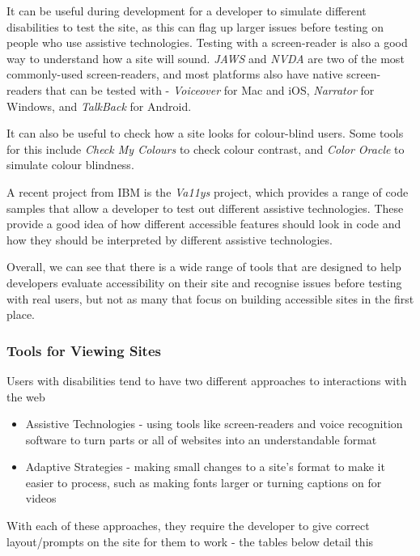 \documentclass[ %
                    author={Aleena Baig},
                supervisor={Dr Simon Lock},
                    degree={BSc},
                     title={On Making Web Accessible Graphs},
                  subtitle={},
                      year={2019} ]{dissertation}
\begin{document}
It can be useful during development for a developer to simulate different disabilities to test the site, as this can flag up larger issues before testing on people who use assistive technologies. Testing with a screen-reader is also a good way to understand how a site will sound. \textit{JAWS} and \textit{NVDA} are two of the most commonly-used screen-readers, and most platforms also have native screen-readers that can be tested with - \textit{Voiceover} for Mac and iOS, \textit{Narrator} for Windows, and \textit{TalkBack} for Android.

It can also be useful to check how a site looks for colour-blind users. Some tools for this include \textit{Check My Colours} to check colour contrast, and \textit{Color Oracle} to simulate colour blindness.

A recent project from IBM is the \textit{Va11ys} project, which provides a range of code samples that allow a developer to test out different assistive technologies. These provide a good idea of how different accessible features should look in code and how they should be interpreted by different assistive technologies.

Overall, we can see that there is a wide range of tools that are designed to help developers evaluate accessibility on their site and recognise issues before testing with real users, but not as many that focus on building accessible sites in the first place.


\subsubsection{Tools for Viewing Sites}

Users with disabilities tend to have two different approaches to interactions with the web

\begin{itemize}
    \item Assistive Technologies - using tools like screen-readers and voice recognition software to turn parts or all of websites into an understandable format
    \item Adaptive Strategies - making small changes to a site's format to make it easier to process, such as making fonts larger or turning captions on for videos
\end{itemize}

With each of these approaches, they require the developer to give correct layout/prompts on the site for them to work - the tables below detail this
\end{document}
